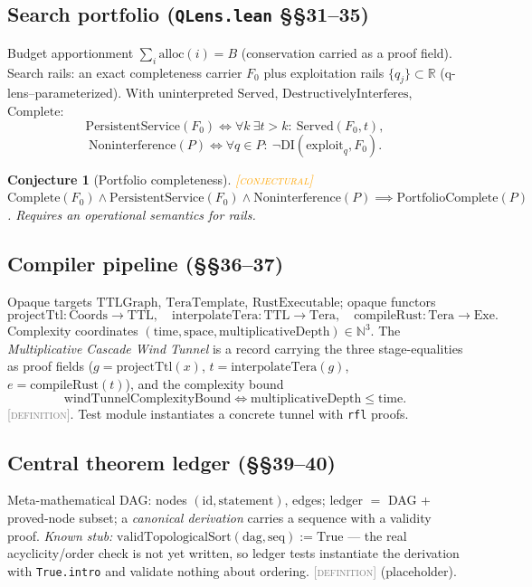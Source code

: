 \documentclass[11pt]{article}
\newcommand{\DEFINITION}{\textcolor{gray}{\textsc{[definition]}}}
\newcommand{\CONJECTURAL}{\textcolor{orange}{\textsc{[conjectural]}}}
\newcommand{\R}{\mathbb{R}}
\newcommand{\N}{\mathbb{N}}
\theoremstyle{plain}
\newtheorem{conjecture}[theorem]{Conjecture}
\theoremstyle{definition}
\begin{document}
\subsection{Search portfolio (\texttt{QLens.lean} \S\S31--35)}
Budget apportionment $\sum_i \mathrm{alloc}(i) = B$ (conservation carried as
a proof field). Search rails: an exact completeness carrier $F_0$ plus
exploitation rails $\{q_j\} \subset \R$ (q-lens--parameterized). With
uninterpreted $\mathrm{Served}$, $\mathrm{DestructivelyInterferes}$,
$\mathrm{Complete}$:
\[
  \mathrm{PersistentService}(F_0) \iff \forall k\ \exists t > k:\
  \mathrm{Served}(F_0, t),
\]
\[
  \mathrm{Noninterference}(P) \iff \forall q \in P:\
  \neg \mathrm{DI}(\mathrm{exploit}_q, F_0).
\]
\begin{conjecture}[Portfolio completeness]\CONJECTURAL\;
$\mathrm{Complete}(F_0) \wedge \mathrm{PersistentService}(F_0) \wedge
\mathrm{Noninterference}(P) \implies \mathrm{PortfolioComplete}(P)$.
Requires an operational semantics for rails.
\end{conjecture}

\subsection{Compiler pipeline (\S\S36--37)}
Opaque targets $\mathrm{TTLGraph}$, $\mathrm{TeraTemplate}$,
$\mathrm{RustExecutable}$; opaque functors
\[
  \mathrm{projectTtl} : \mathrm{Coords} \to \mathrm{TTL},
  \quad
  \mathrm{interpolateTera} : \mathrm{TTL} \to \mathrm{Tera},
  \quad
  \mathrm{compileRust} : \mathrm{Tera} \to \mathrm{Exe}.
\]
Complexity coordinates $(\text{time}, \text{space},
\text{multiplicativeDepth}) \in \N^3$. The \emph{Multiplicative Cascade Wind
Tunnel} is a record carrying the three stage-equalities as proof fields
($g = \mathrm{projectTtl}(x)$, $t = \mathrm{interpolateTera}(g)$,
$e = \mathrm{compileRust}(t)$), and the complexity bound
\[
  \mathrm{windTunnelComplexityBound} \iff
  \text{multiplicativeDepth} \le \text{time}.
\]
\DEFINITION. Test module instantiates a concrete tunnel with \texttt{rfl}
proofs.

\subsection{Central theorem ledger (\S\S39--40)}
Meta-mathematical DAG: nodes $(\mathrm{id}, \mathrm{statement})$, edges;
ledger $=$ DAG + proved-node subset; a \emph{canonical derivation} carries a
sequence with a validity proof. \emph{Known stub:}
$\mathrm{validTopologicalSort}(\mathrm{dag}, \mathrm{seq}) := \mathrm{True}$
--- the real acyclicity/order check is not yet written, so ledger tests
instantiate the derivation with \texttt{True.intro} and validate nothing
about ordering. \DEFINITION{} (placeholder).
\end{document}
